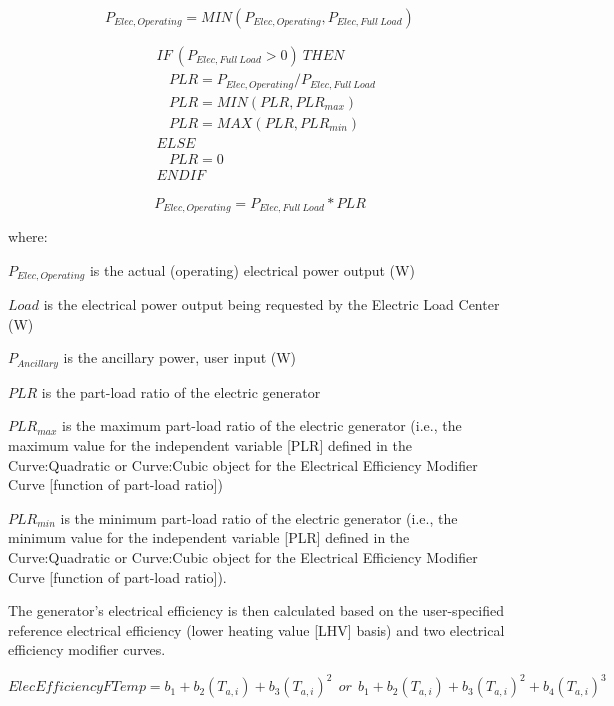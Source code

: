 \begin{equation}
{P_{Elec,Operating}} = MIN\left( {{P_{Elec,Operating}},{P_{Elec,Full~Load}}} \right)
\end{equation}

\begin{equation}
\begin{array}{l}
~~~~IF~( {P_{Elec,Full~Load}} > 0 )~THEN \\
~~~~~~~~PLR = {P_{Elec,Operating}} / {P_{Elec,Full~Load}} \\
~~~~~~~~PLR = MIN( PLR, PLR_{max} ) \\
~~~~~~~~PLR = MAX( PLR, PLR_{min} ) \\
~~~~ELSE \\
~~~~~~~~PLR = 0 \\
~~~~END IF
\end{array}
\end{equation}

\begin{equation}
{P_{Elec,Operating}} = {P_{Elec,Full~Load}} * PLR
\end{equation}

where:

\({P_{Elec,Operating}}\) is the actual (operating) electrical power output (W)

\(Load\) is the electrical power output being requested by the Electric Load Center (W)

\({P_{Ancillary}}\) is the ancillary power, user input (W)

\(PLR\) is the part-load ratio of the electric generator

\(PL{R_{max}}\) is the maximum part-load ratio of the electric generator (i.e., the maximum value for the independent variable {[}PLR{]} defined in the Curve:Quadratic or Curve:Cubic object for the Electrical Efficiency Modifier Curve {[}function of part-load ratio{]})

\(PL{R_{min}}\) is the minimum part-load ratio of the electric generator (i.e., the minimum value for the independent variable {[}PLR{]} defined in the Curve:Quadratic or Curve:Cubic object for the Electrical Efficiency Modifier Curve {[}function of part-load ratio{]}).

The generator's electrical efficiency is then calculated based on the user-specified reference electrical efficiency (lower heating value {[}LHV{]} basis) and two electrical efficiency modifier curves.

\begin{equation}
ElecEfficiencyFTemp = {b_1} + {b_2}\left( {{T_{a,i}}} \right) + {b_3}{\left( {{T_{a,i}}} \right)^2}~~or~~{b_1} + {b_2}\left( {{T_{a,i}}} \right) + {b_3}{\left( {{T_{a,i}}} \right)^2} + {b_4}{\left( {{T_{a,i}}} \right)^3}
\end{equation}

